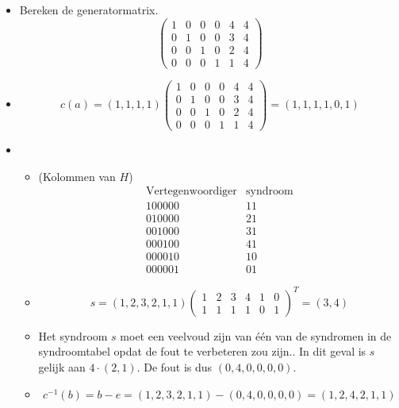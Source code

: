 \documentclass[main.tex]{subfiles}
\begin{document}
\begin{itemize}
\item Bereken de generatormatrix.
\[
\begin{pmatrix}
  1 & 0 & 0 & 0 & 4 & 4\\
  0 & 1 & 0 & 0 & 3 & 4\\
  0 & 0 & 1 & 0 & 2 & 4\\
  0 & 0 & 0 & 1 & 1 & 4
\end{pmatrix}
\]
\item
  \[ 
  c(a) = (1,1,1,1)
  \begin{pmatrix}
    1 & 0 & 0 & 0 & 4 & 4\\
    0 & 1 & 0 & 0 & 3 & 4\\
    0 & 0 & 1 & 0 & 2 & 4\\
    0 & 0 & 0 & 1 & 1 & 4
  \end{pmatrix}
  = (1,1,1,1,0,1)
  \]
\item
  \begin{itemize}
  \item (Kolommen van $H$)
    \[
    \begin{array}{c|c}
      \text{Vertegenwoordiger} & \text{syndroom}\\\hline
      100000 & 11\\
      010000 & 21\\
      001000 & 31\\
      000100 & 41\\
      000010 & 10\\
      000001 & 01
    \end{array}
    \]
  \item 
    \[
    s = (1,2,3,2,1,1)
    \begin{pmatrix}
      1 & 2 & 3 & 4 & 1 & 0\\
      1 & 1 & 1 & 1 & 0 & 1
    \end{pmatrix}^{T}
    = (3,4)
    \]
  \item Het syndroom $s$ moet een veelvoud zijn van \'e\'en van de syndromen in de syndroomtabel opdat de fout te verbeteren zou zijn..
    In dit geval is $s$ gelijk aan $4\cdot (2,1)$.
    De fout is dus $(0,4,0,0,0,0)$.
  \item 
    \[
    c^{-1}(b) = b-e= (1,2,3,2,1,1) - (0,4,0,0,0,0)= (1,2,4,2,1,1)
    \]
  \end{itemize}
\end{itemize}
\end{document}
